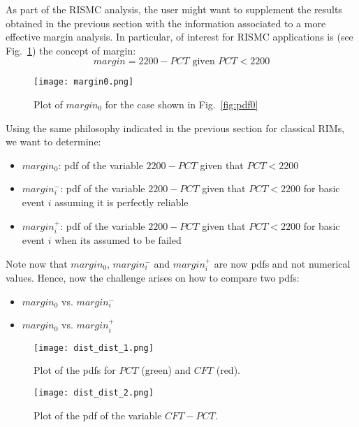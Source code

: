 As part of the RISMC analysis, the user might want to supplement the results obtained in the 
previous section with the information associated to a more effective margin analysis.
In particular, of interest for RISMC applications is (see Fig.~\ref{fig:margin0}) the concept of margin:
\begin{equation}
  margin= 2200-PCT \text{ given } PCT<2200
  \label{eq:margin}
\end{equation}

\begin{figure}
    \centering
    \centerline{\texttt{[image: margin0.png]}}
    \caption{Plot of $margin_0$ for the case shown in Fig.~\ref{fig:pdf0}}
    \label{fig:margin0}
\end{figure}
 
Using the same philosophy indicated in the previous section for classical RIMs, we want 
to determine:
\begin{itemize}
  \item $margin_0$: pdf of the variable $2200-PCT$ given that $PCT<2200$
  \item $margin_i^-$: pdf of the variable $2200-PCT$ given that $PCT<2200$ for basic 
                      event $i$ assuming it is perfectly reliable
  \item $margin_i^+$: pdf of the variable $2200-PCT$ given that $PCT<2200$ for basic event 
                      $i$ when its assumed to be failed
\end{itemize}

Note now that $margin_0$, $margin_i^-$ and $margin_i^+$ are now pdfs and not numerical values. 
Hence, now the challenge arises on how to compare two pdfs:
\begin{itemize}
  \item $margin_0$ vs. $margin_i^-$
  \item $margin_0$ vs. $margin_i^+$
\end{itemize}

\begin{figure}
    \centering
    \centerline{\texttt{[image: dist\_dist\_1.png]}}
    \caption{Plot of the pdfs for $PCT$ (green) and $CFT$ (red).}
    \label{fig:dist_dist_1}
\end{figure}

\begin{figure}
    \centering
    \centerline{\texttt{[image: dist\_dist\_2.png]}}
    \caption{Plot of the pdf of the variable $CFT-PCT$.}
    \label{fig:dist_dist_2}
\end{figure}

